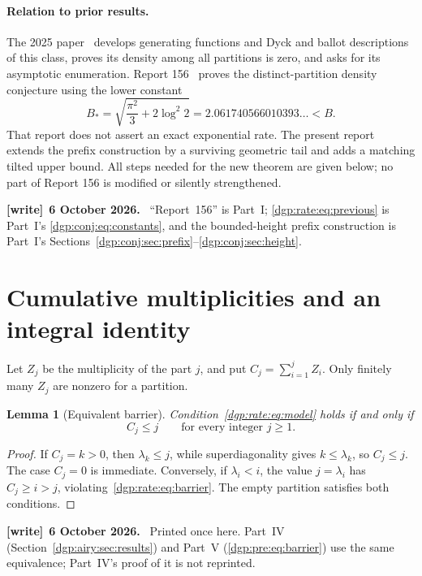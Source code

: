 \documentclass[11pt,letterpaper]{article}
\numberwithin{equation}{section}
\newtheorem{lemma}[theorem]{Lemma}
\theoremstyle{remark}\newtheorem{remark}[theorem]{Remark}
\newenvironment{writenote}[1][]{\par\smallskip\begingroup\small
 \noindent\textbf{[write]}\if\relax\detokenize{#1}\relax\else~\textbf{#1.}\fi\ }%
 {\par\endgroup\smallskip}
\begin{document}
\paragraph{Relation to prior results.}
The 2025 paper~\cite{abek} develops generating functions and Dyck and
ballot descriptions of this class, proves its density among all partitions
is zero, and asks for its asymptotic enumeration. Report 156~\cite{r156}
proves the distinct-partition density conjecture using the lower constant
\begin{equation}\label{dgp:rate:eq:previous}
 B_* =\sqrt{\frac{\pi^2}{3}+2\log^2 2}
      =2.061740566010393\ldots < B.
\end{equation}
That report does not assert an exact exponential rate. The present report
extends the prefix construction by a surviving geometric tail and adds a
matching tilted upper bound. All steps needed for the new theorem are
given below; no part of Report 156 is modified or silently strengthened.
\begin{writenote}[6 October 2026]
``Report~156'' \cite{r156} is Part~I; \eqref{dgp:rate:eq:previous} is Part~I's \eqref{dgp:conj:eq:constants}, and the bounded-height prefix construction is Part~I's Sections~\ref{dgp:conj:sec:prefix}--\ref{dgp:conj:sec:height}.
\end{writenote}

\section{Cumulative multiplicities and an integral identity}\label{dgp:rate:sec:cumulative}
Let $Z_j$ be the multiplicity of the part $j$, and put
$C_j=\sum_{i=1}^jZ_i$. Only finitely many $Z_j$ are nonzero for a partition.

\begin{lemma}[Equivalent barrier]\label{dgp:rate:lem:barrier}
Condition~\eqref{dgp:rate:eq:model} holds if and only if
\begin{equation}\label{dgp:rate:eq:barrier}
 C_j\leq j\qquad\text{for every integer }j\geq1.
\end{equation}
\end{lemma}
\begin{proof}
If $C_j=k>0$, then $\lambda_k\leq j$, while superdiagonality gives
$k\leq\lambda_k$, so $C_j\leq j$. The case $C_j=0$ is immediate.
Conversely, if $\lambda_i<i$, the value $j=\lambda_i$ has
$C_j\geq i>j$, violating~\eqref{dgp:rate:eq:barrier}. The empty partition satisfies
both conditions.
\end{proof}
\begin{writenote}[6 October 2026]
Printed once here. Part~IV (Section~\ref{dgp:airy:sec:results}) and Part~V (\eqref{dgp:pre:eq:barrier}) use the same equivalence; Part~IV's proof of it is not reprinted.
\end{writenote}
\end{document}
